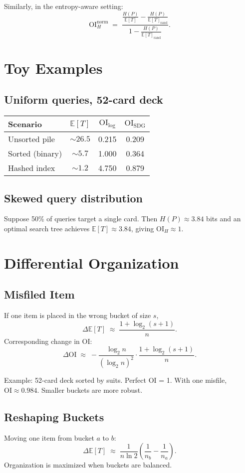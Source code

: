\documentclass[11pt]{article}
\begin{document}
Similarly, in the entropy-aware setting:
\[
\mathrm{OI}^{\mathrm{norm}}_H \;=\;
\frac{\tfrac{H(P)}{\mathbb{E}[T]} - \tfrac{H(P)}{\mathbb{E}[T]_{\mathrm{rand}}}}
{1 - \tfrac{H(P)}{\mathbb{E}[T]_{\mathrm{rand}}}}.
\]


\section{Toy Examples}
\subsection{Uniform queries, 52-card deck}
\begin{center}
\begin{tabular}{lccc}
\toprule
Scenario & $\mathbb{E}[T]$ & $\mathrm{OI}_{\log}$ & $\mathrm{OI}_{\text{SDG}}$ \\
\midrule
Unsorted pile   & $\sim26.5$ & 0.215 & 0.209 \\
Sorted (binary) & $\sim5.7$  & 1.000 & 0.364 \\
Hashed index    & $\sim1.2$  & 4.750 & 0.879 \\
\bottomrule
\end{tabular}
\end{center}

\subsection{Skewed query distribution}
Suppose 50\% of queries target a single card. Then
$H(P)\approx 3.84$ bits and an optimal search tree achieves
$\mathbb{E}[T]\approx 3.84$, giving $\mathrm{OI}_H\approx 1$.

\section{Differential Organization}
\subsection{Misfiled Item}
If one item is placed in the wrong bucket of size $s$,
\[
\Delta \mathbb{E}[T] \;\approx\; \frac{1+\log_2(s+1)}{n}.
\]
Corresponding change in OI:
\[
\Delta \mathrm{OI} \;\approx\;
-\frac{\log_2 n}{(\log_2 n)^2}\cdot \frac{1+\log_2(s+1)}{n}.
\]

Example: 52-card deck sorted by suits. Perfect OI = 1. With one misfile,
$\mathrm{OI} \approx 0.984$. Smaller buckets are more robust.

\subsection{Reshaping Buckets}
Moving one item from bucket $a$ to $b$:
\[
\Delta \mathbb{E}[T] \;\approx\; \frac{1}{n\ln 2}
\left(\frac{1}{n_b} - \frac{1}{n_a}\right).
\]
Organization is maximized when buckets are balanced.
\end{document}
